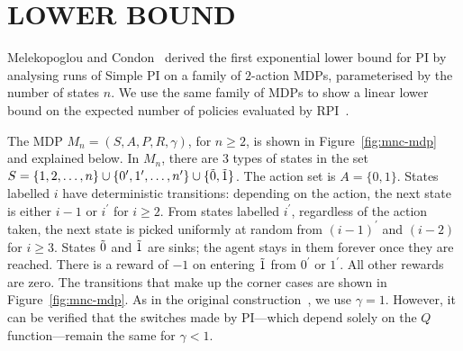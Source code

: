 \section{LOWER BOUND}
\label{sec:lowerbound}



Melekopoglou and Condon~ derived the first exponential lower bound for PI by analysing runs of Simple PI on a family of $2$-action MDPs, parameterised by the number of states $n$. We  use the same family of MDPs to show a linear lower bound on the expected number of policies evaluated by RPI~\cite{Mansour+Singh:1999}.

The MDP $M_n = (S, A, P, R, \gamma)$, for $n \geq 2$, is
shown in Figure~\ref{fig:mnc-mdp} and explained below. 
In $M_{n}$, there are $3$ types of states in the set $S=\{1, 2, \dots, n\} \cup \{ 0^{\prime}, 1^{\prime}, \dots, n^{\prime}\} \cup \{\Tilde{0}, \Tilde{1}\}$. The action set is $A=\{0, 1\}$. States labelled $i$ have deterministic transitions: depending on the action, the next state 
is either $i-1$ or $i^{\prime}$ for $i\ge 2$. From states labelled $i^{\prime}$, regardless of the action taken, the next state is picked uniformly at random from $(i-1)^{\prime}$ and $(i-2)$ for $i \ge 3$. States $\Tilde{0}$ and $\Tilde{1}$ are sinks; the agent stays in them forever once they are reached. There is a reward of $-1$ on entering $\Tilde{1}$ from $0^{\prime}$ or $1^{\prime}$. All other rewards are zero. The transitions that make up the corner cases are shown in Figure~\ref{fig:mnc-mdp}. As in the original construction~\cite{Melekopoglou+Condon:1994}, we use $\gamma = 1$. However, it can be verified that the switches made by PI---which depend solely on the $Q$ function---remain the same for 
$\gamma < 1$. 




